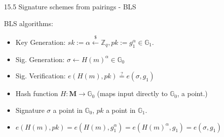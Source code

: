 \documentclass[aspectratio=169,xcolor=dvipsnames]{beamer}
\newcommand{\Go}{\mathbb{G}_0}
\newcommand{\Gi}{\mathbb{G}_1}
\begin{document}
\begin{frame}{15.5 Signature schemes from pairings - BLS}
\begin{theorem}
    BLS algorithms:
    \begin{itemize}
        \item Key Generation: $sk := \alpha \overset{{\scriptscriptstyle\$}}{\leftarrow} \mathbb{Z}_{q}, pk := g_{1}^{\alpha} \in \Gi$. 
        \item Sig. Generation: $\sigma \leftarrow H(m)^\alpha \in \Go$
        \item Sig. Verification: $e(H(m), pk) \overset{?}{=} e(\sigma, g_1)$
    \end{itemize}
\end{theorem}
    \begin{itemize}
        \item Hash function $H: \mathbf{M} \rightarrow \Go$ (maps input directly to $\Go$, a point.)
        \item Signature $\sigma$ a point in $\Go$, $pk$ a point in $\Gi$.
        \item  $e(H(m), pk) = e(H(m), g_{1}^\alpha) = e(H(m)^\alpha, g_1) = e(\sigma, g_1)$
    \end{itemize} 
\end{frame}
\end{document}
